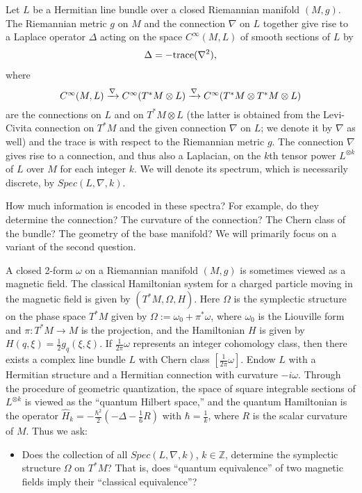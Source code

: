 \documentclass[12pt,leqno]{amsart}%
\theoremstyle{definition}
\theoremstyle{remark}
\numberwithin{equation}{section}
\def\Z{{\mathbb{Z}}}
\def\nab{{\nabla}}
\def\Lk{{L^{\otimes k}}}
\begin{document}
Let $L$ be a Hermitian line bundle over a closed Riemannian manifold $(M,g)$.
The Riemannian metric $g$ on $M$ and the connection $\nab$ on $L$
together give rise to a Laplace operator $\Delta$ acting on the space
$C^\infty(M,L)$ of smooth sections of $L$ by
\begin{equation}\label{BundleLaplacian}
\Delta=-\rm{trace}(\nab^2),
\end{equation}
where
\[
\begin{CD}
C^\infty(M,L)\xrightarrow{\nabla}  C^\infty(T^*M\otimes L)\xrightarrow{\nabla}
C^\infty(T^*M\otimes T^*M\otimes L)
\end{CD}
\]
are the connections on $L$ and on $T^*M\otimes L$ (the latter is obtained from
the Levi-Civita connection on $T^*M$ and the given
connection $\nab$ on $L$; we denote it by $\nab$ as well)
and the trace is with respect to the Riemannian metric $g$.
The connection $\nab$ gives rise to a connection,
and thus also a
Laplacian, on the $k$th tensor power $\Lk$ of $L$ over $M$ for each integer $k$.
We will denote its spectrum, which is necessarily discrete, by $Spec(L,\nab,
k)$.

How much information is
encoded in these spectra?  For example, do they determine the connection?  The
curvature of the connection?  The Chern class of the bundle?  The geometry of
the base manifold?  We will primarily focus on a variant of the second question.

A closed 2-form $\omega$ on a Riemannian manifold $(M,g)$ is sometimes viewed as
a magnetic field.   The classical Hamiltonian system for a
charged particle
moving in the magnetic field is given by $(T^{\ast}M, \Omega, H)$.  Here
$\Omega$ is the symplectic structure on the phase space $T^*M$ given by
$\Omega:=\omega_{0}+\pi^{\ast}\omega$, where $\omega_{0}$ is the Liouville form
and $\pi:T^{\ast}M\rightarrow M$ is the projection,
and the Hamiltonian $H$ is given by $H(q,\xi)=\frac{1}{2}g_q(\xi,\xi).$   If
$\frac{1}{2\pi}\omega$ represents an integer cohomology class, then there exists
a
complex line bundle $L$ with Chern class $[\frac{1}{2\pi}\omega]$.  Endow $L$
with a
Hermitian structure and a Hermitian connection with curvature $-i\omega$.
Through the procedure of geometric quantization, the space of square integrable
sections of $\Lk$ is viewed as the ``quantum Hilbert space,'' and the quantum
Hamiltonian is the operator
$\widehat{H}_{k}=-\frac{\hbar^{2}}{2}(-\Delta-\tfrac{1}{6}R)$ with
$\hbar=\frac{1}{k}$, where $R$ is the scalar curvature of $M$.   Thus we ask:

\begin{itemize}
\item Does the collection of all $Spec(L,\nab,k)$, $k\in\Z$, determine the
symplectic structure $\Omega$ on $T^*M$?  That is, does ``quantum equivalence''
of two
magnetic fields imply their ``classical equivalence''?
\end{itemize}
\end{document}
